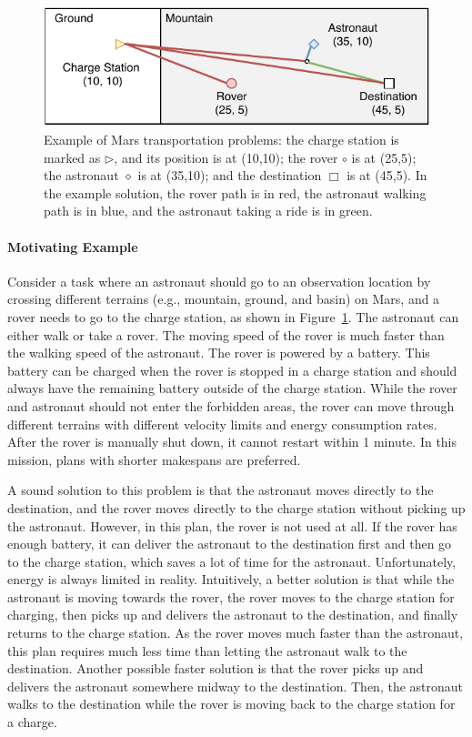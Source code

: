 \documentclass[sigconf]{acmart}
\begin{document}
\begin{figure}[t]
\centering
\includegraphics[width=0.9\columnwidth]{images/map.pdf}
\caption{\small Example of Mars transportation problems: the charge station is marked as $\triangleright$, and its position is at (10,10); the rover $\circ$ is at (25,5); the astronaut $\diamond$ is at (35,10); and the destination $\Box$ is at (45,5). In the example solution, the rover path is in red, the astronaut walking path is in blue, and the astronaut taking a ride is in green.}
\label{fig:map}
\end{figure} 

\paragraph{Motivating Example} Consider a task where an astronaut should go to an observation location by crossing different terrains (e.g., mountain, ground, and basin) on Mars, and a rover needs to go to the charge station, as shown in Figure~\ref{fig:map}. The astronaut can either walk or take a rover. The moving speed of the rover is much faster than the walking speed of the astronaut. The rover is powered by a battery. This battery can be charged when the rover is stopped in a charge station and should always have the remaining battery outside of the charge station. While the rover and astronaut should not enter the forbidden areas, the rover can move through different terrains with different velocity limits and energy consumption rates. After the rover is manually shut down, it cannot restart within 1 minute. In this mission, plans with shorter makespans are preferred.

A sound solution to this problem is that the astronaut moves directly to the destination, and the rover moves directly to the charge station without picking up the astronaut. However, in this plan, the rover is not used at all. If the rover has enough battery, it can deliver the astronaut to the destination first and then go to the charge station, which saves a lot of time for the astronaut. Unfortunately, energy is always limited in reality. Intuitively, a better solution is that while the astronaut is moving towards the rover, the rover moves to the charge station for charging, then picks up and delivers the astronaut to the destination, and finally returns to the charge station. As the rover moves much faster than the astronaut, this plan requires much less time than letting the astronaut walk to the destination. Another possible faster solution is that the rover picks up and delivers the astronaut somewhere midway to the destination. Then, the astronaut walks to the destination while the rover is moving back to the charge station for a charge.
\end{document}
